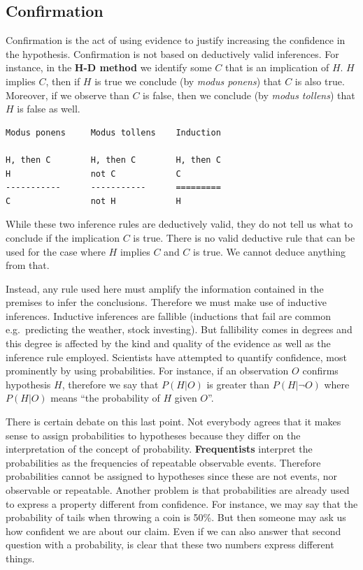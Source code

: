\documentclass[
  12pt,
]{book}
\begin{document}
\subsection{Confirmation}\label{confirmation}

Confirmation is the act of using evidence to justify increasing the confidence in the hypothesis. Confirmation is not based on deductively valid inferences. For instance, in the \textbf{H-D method} we identify some \(C\) that is an implication of \(H\). \(H\) implies \(C\), then if \(H\) is true we conclude (by \emph{modus ponens}) that \(C\) is also true. Moreover, if we observe than \(C\) is false, then we conclude (by \emph{modus tollens}) that \(H\) is false as well.

\begin{verbatim}
Modus ponens     Modus tollens    Induction

H, then C        H, then C        H, then C
H                not C            C
-----------      -----------      =========
C                not H            H 
\end{verbatim}

While these two inference rules are deductively valid, they do not tell us what to conclude if the implication \(C\) is true. There is no valid deductive rule that can be used for the case where \(H\) implies \(C\) and \(C\) is true. We cannot deduce anything from that.

Instead, any rule used here must amplify the information contained in the premises to infer the conclusions. Therefore we must make use of inductive inferences. Inductive inferences are fallible (inductions that fail are common e.g.~predicting the weather, stock investing). But fallibility comes in degrees and this degree is affected by the kind and quality of the evidence as well as the inference rule employed. Scientists have attempted to quantify confidence, most prominently by using probabilities. For instance, if an observation \(O\) confirms hypothesis \(H\), therefore we say that \(P(H|O)\) is greater than \(P(H|\lnot O)\) where \(P(H|O)\) means ``the probability of \(H\) given \(O\)''.

There is certain debate on this last point. Not everybody agrees that it makes sense to assign probabilities to hypotheses because they differ on the interpretation of the concept of probability. \textbf{Frequentists} interpret the probabilities as the frequencies of repeatable observable events. Therefore probabilities cannot be assigned to hypotheses since these are not events, nor observable or repeatable. Another problem is that probabilities are already used to express a property different from confidence. For instance, we may say that the probability of tails when throwing a coin is 50\%. But then someone may ask us how confident we are about our claim. Even if we can also answer that second question with a probability, is clear that these two numbers express different things.
\end{document}
